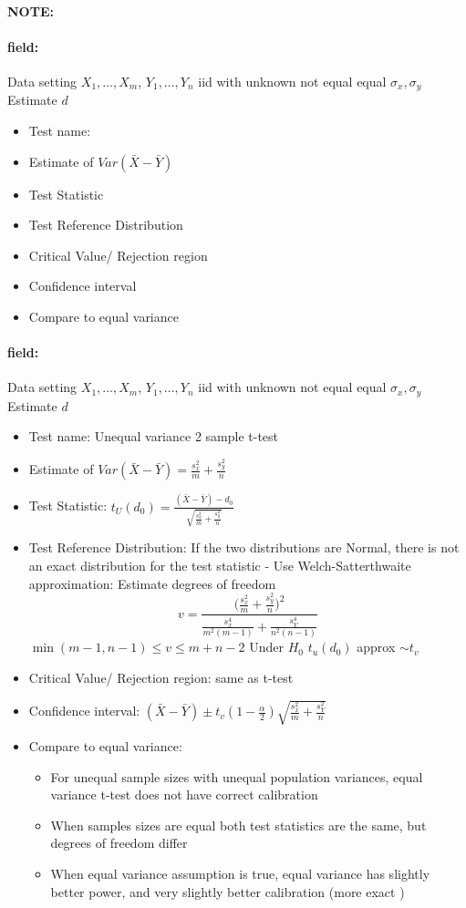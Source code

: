 \documentclass[12pt]{article}
\newenvironment{note}{\paragraph{NOTE:}}{}
\newenvironment{field}{\paragraph{field:}}{}
\begin{document}
\begin{note}
  \begin{field}
    Data setting $X_1, \ldots , X_m$, $Y_1, \ldots, Y_n$ iid with unknown not equal equal  $\sigma_x, \sigma_y$ Estimate $d$
    \begin{itemize}
      \item Test name:
      \item Estimate of $Var(\bar{X} - \bar{Y})$
      \item Test Statistic
      \item Test Reference Distribution
      \item Critical Value/ Rejection region
      \item Confidence interval
      \item Compare to equal variance
    \end{itemize}
  \end{field}
  \begin{field}
    Data setting $X_1, \ldots , X_m$, $Y_1, \ldots, Y_n$ iid with unknown not equal equal  $\sigma_x, \sigma_y$ Estimate $d$
    \begin{itemize}
      \item Test name: Unequal variance 2 sample t-test
      \item Estimate of $Var(\bar{X} - \bar{Y}) = \frac{s_x^2}{m} + \frac{s_y^2}{n}$
      \item Test Statistic: $t_U(d_0) = \frac{(\bar{X} - \bar{Y}) - d_0}{\sqrt{\frac{s_x^2}{m} + \frac{s_y^2}{n}}}$
      \item Test Reference Distribution: If the two distributions are Normal, there is not an exact distribution for the test statistic -  Use Welch-Satterthwaite approximation: Estimate degrees of freedom
      $$ v = \frac{\big(\frac{s_x^2}{m} + \frac{s_y^2}{n}\big)^2}{\frac{s_x^4}{m^2(m-1)} + \frac{s_Y^4}{n^2(n-1)}}$$
      $\min(m-1,n-1) \leq v \leq m+n-2$
      Under $H_0$ $t_u(d_0) $ approx $\sim t_{v}$
      \item Critical Value/ Rejection region: same as t-test
      \item Confidence interval: $(\bar{X} - \bar{Y}) \pm t_v(1 - \frac{\alpha}{2})\sqrt{\frac{s_x^2}{m} + \frac{s_Y^2}{n}}$
      \item Compare to equal variance:
      \begin{itemize}
        \item For unequal sample sizes with unequal population variances, equal variance t-test does not have correct calibration
        \item When samples sizes are equal both test statistics are the same, but degrees of freedom differ
        \item When equal variance assumption is true, equal variance has slightly better power, and very slightly better calibration (more exact )
      \end{itemize}
    \end{itemize}
  \end{field}
\end{note}
\end{document}
